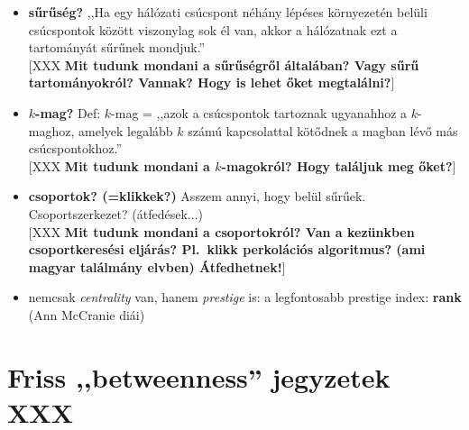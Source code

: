 \documentclass{llncs}
\newcommand{\embf}[1]{\textbf{#1}}
\newcommand{\XXX}[1]{{\small \color{megjcolor} [XXX #1]}}
\newcommand{\XXXb}[1]{\XXX{\embf{#1}}}
\begin{document}
\begin{itemize}
\begin{itemize}
A \embf{csúcserősség} (esetünkben) tök ugyanez: benyíl-súlyösszeg.

\item
\emph{[globális]} \embf{köztiség (betweenness)}.
Def: (\cite{kovacs2012magyar}-ban sztem zavaros)
sztem: hány legrövidebb út meg át a csomóponton;
avagy: a legrövidebb utak hány \%-a megy át a csomóponton.\\
\XXXb{Mi a helyzet ezzel?}\\
\XXXb{SEJTÉS: olyasmit vélek, hogy ez összefőgg vhogy a szófajokkal,
vagy legalábbis vmilyen típusú szavaknak nagyobb/kisebb lesz.
Pl.\ a névelőnek nem nagy? [Ez már egy bazi jó eredmény lenne sztem!]}

\item \embf{closeness centrality} is van -- de sztem most hagyjuk :)

\end{itemize}

\item 
\embf{sűrűség?} 
,,Ha egy hálózati csúcspont néhány lépéses környezetén belüli csúcspontok között viszonylag sok él van, akkor a hálózatnak ezt a tartományát sűrűnek mondjuk.''\\
\XXXb{Mit tudunk mondani a sűrűségről általában? Vagy sűrű tartományokról? Vannak? Hogy is lehet őket megtalálni?}

\item
\embf{$k$-mag?}
Def: $k$-mag = ,,azok a csúcspontok tartoznak ugyanahhoz a $k$-maghoz, amelyek legalább $k$ számú kapcsolattal kötődnek a magban lévő más csúcspontokhoz.''\\
\XXXb{Mit tudunk mondani a $k$-magokról? Hogy találjuk meg őket?}

\item
\embf{csoportok? (=klikkek?)}
Asszem annyi, hogy belül sűrűek. Csoportszerkezet? (átfedések...)\\
\XXXb{Mit tudunk mondani a csoportokról?
Van a kezünkben csoportkeresési eljárás?
Pl.\ klikk perkolációs algoritmus? (ami magyar találmány elvben)
Átfedhetnek!}

\item
nemcsak \emph{centrality} van, hanem \emph{prestige} is:
a legfontosabb prestige index: \embf{rank} (Ann McCranie diái)

\end{itemize}


\newpage %

\section{Friss ,,betweenness'' jegyzetek XXX}
\end{document}
